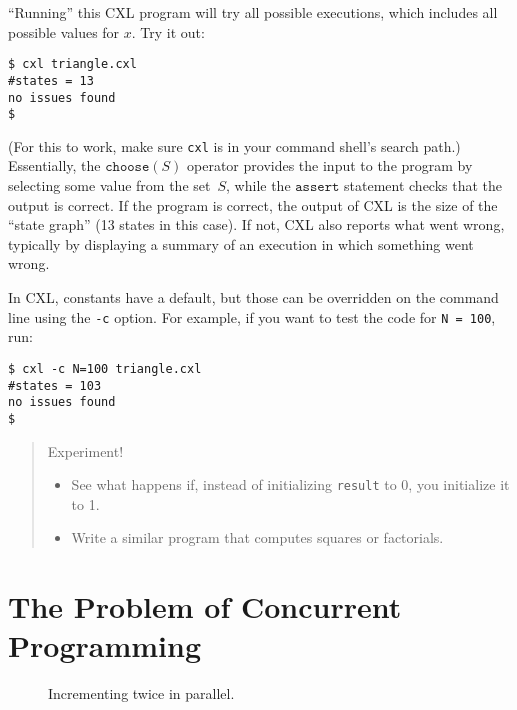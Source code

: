 \documentclass{report}
\newenvironment{code}{
\tcolorbox
}{
\endtcolorbox
}
\begin{document}
``Running'' this CXL program will try all possible executions, which
includes all possible values for $x$.  Try it out:

\begin{code}
\begin{verbatim}
$ cxl triangle.cxl
#states = 13
no issues found
$
\end{verbatim}
\end{code}

(For this to work, make sure \texttt{cxl} is in your command shell's search path.)
Essentially, the $\texttt{choose}(S)$
operator provides the input to the program by selecting some value from the
set~$S$, while the $\texttt{assert}$ statement checks that the output is
correct.  If the program is correct, the output of CXL is the size of the
``state graph'' (13 states in this case).  If not, CXL also
reports what went wrong, typically by displaying a summary of an execution in
which something went wrong.

In CXL, constants have a default, but those can be overridden on the command
line using the \texttt{-c} option.
For example, if you want to test the code for \texttt{N = 100}, run:
\begin{code}
\begin{verbatim}
$ cxl -c N=100 triangle.cxl
#states = 103
no issues found
$
\end{verbatim}
\end{code}

\begin{quote}
Experiment!
\begin{itemize}
\item See what happens if, instead of initializing \texttt{result} to 0,
you initialize it to 1.
\item Write a similar program that computes squares or factorials.
\end{itemize}
\end{quote}

\chapter{The Problem of Concurrent Programming}

\begin{figure}
\begin{code}
\end{code}
\caption{Incrementing twice in parallel.}
\label{fig:inc}
\end{figure}
\end{document}
